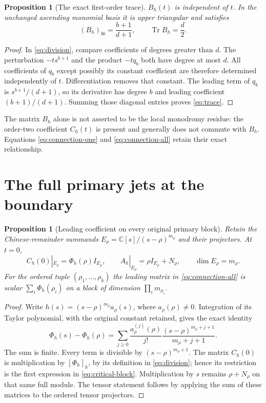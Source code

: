 \documentclass[11pt]{article}
\newtheorem{proposition}[theorem]{Proposition}
\DeclareMathOperator{\Tr}{Tr}
\newcommand{\C}{\mathbb C}
\begin{document}
\begin{proposition}[The exact first-order trace]
$B_h(t)$ is independent of $t$.  In the unchanged ascending monomial
basis it is upper triangular and satisfies
\begin{equation}
 (B_h)_{bb}=\frac{b+1}{d+1},\qquad
 \boxed{\Tr B_h=\frac d2.}
 \label{eq:trace}
\end{equation}
\end{proposition}
\begin{proof}
In \eqref{eq:division}, compare coefficients of degrees greater than
$d$.  The perturbation $-ts^{b+1}$ and the product $-tq_b$ both have
degree at most $d$.  All coefficients of $q_b$ except possibly its
constant coefficient are therefore determined independently of $t$.
Differentiation removes that constant.  The leading term of $q_b$ is
$s^{b+1}/(d+1)$, so its derivative has degree $b$ and leading coefficient
$(b+1)/(d+1)$.  Summing those diagonal entries proves
\eqref{eq:trace}.
\end{proof}

The matrix $B_h$ alone is not asserted to be the local monodromy
residue: the order-two coefficient $C_h(t)$ is present and generally
does not commute with $B_h$.  Equations \eqref{eq:connection-one} and
\eqref{eq:connection-all} retain their exact relationship.

\section{The full primary jets at the boundary}

\begin{proposition}[Leading coefficient on every original primary block]
Retain the Chinese-remainder summands
$E_\rho=\C[s]/(s-\rho)^{m_\rho}$ and their projectors.  At $t=0$,
\begin{equation}
 C_h(0)|_{E_\rho}=\Phi_h(\rho)I_{E_\rho},\qquad
 A_h|_{E_\rho}=\rho I_{E_\rho}+N_\rho,\qquad
 \dim E_\rho=m_\rho.
 \label{eq:critical-block}
\end{equation}
For the ordered tuple $(\rho_1,\ldots,\rho_k)$ the leading matrix in
\eqref{eq:connection-all} is scalar
$\sum_i\Phi_h(\rho_i)$ on a block of dimension
$\prod_i m_{\rho_i}$.
\end{proposition}
\begin{proof}
Write $h(s)=(s-\rho)^{m_\rho}a_\rho(s)$, where
$a_\rho(\rho)\ne0$.  Integration of its Taylor polynomial, with the
original constant retained, gives the exact identity
\begin{equation}
 \Phi_h(s)-\Phi_h(\rho)=
 \sum_{j\ge0}\frac{a_\rho^{(j)}(\rho)}{j!}
       \frac{(s-\rho)^{m_\rho+j+1}}{m_\rho+j+1}.
 \label{eq:full-taylor}
\end{equation}
The sum is finite.  Every term is divisible by
$(s-\rho)^{m_\rho+1}$.  The matrix $C_h(0)$ is multiplication by
$[\Phi_h]_h$, by its definition in \eqref{eq:division}; hence its
restriction is the first expression in \eqref{eq:critical-block}.
Multiplication by $s$ remains $\rho+N_\rho$ on that same full module.
The tensor statement follows by applying the sum of these matrices
to the ordered tensor projectors.
\end{proof}
\end{document}
